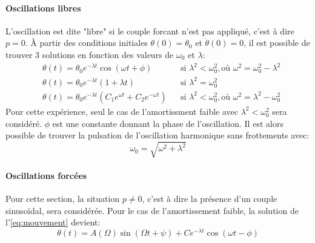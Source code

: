 \paragraph*{Oscillations libres}
L'oscillation est dite "libre" si le couple forcant n'est pas appliqué, c'est à dire \(p = 0\). À partir des conditions initiales \(\theta(0) = \theta_0\) et \(\dot\theta(0) = 0\), il est possible de trouver 3 solutions en fonction des valeurs de \(\omega_0\) et \(\lambda\):
\begin{align}
    &\theta(t) = \theta_0 e^{-\lambda t} \cos (\omega t + \phi) &&\textrm{si } \lambda^2 < \omega_0^2, \textrm{où } \omega^2 = \omega_0^2 - \lambda^2 \\
    \label{eq:oscil_libre}
    &\theta(t) = \theta_0 e^{-\lambda t} (1 + \lambda t) &&\textrm{si } \lambda^2 = \omega_0^2 \\
    &\theta(t) = \theta_0 e^{-\lambda t} \left(C_1e^{\omega t} + C_2e^{-\omega t}\right) &&\textrm{si } \lambda^2 < \omega_0^2, \textrm{où } \omega^2 = \lambda^2 - \omega_0^2
\end{align}
Pour cette expérience, seul le cas de l'amortissment faible avec \(\lambda^2 < \omega_0^2\) sera considéré. \(\phi\) est une constante donnant la phase de l'oscillation. Il est alors possible de trouver la pulsation de l'oscillation harmonique sans frottements avec:
\begin{equation}
    \omega_0 = \sqrt{\omega^2 + \lambda^2}
    \label{eq:omega_0}
\end{equation}

\paragraph*{Oscillations forcées}
Pour cette section, la situation \(p \ne 0\), c'est à dire la présence d'un couple sinusoïdal, sera considérée. Pour le cas de l'amortissement faible, la solution de l'\autoref{eq:mouvement} devient:
\begin{equation}
    \theta(t) = A(\Omega) \sin(\Omega t + \psi) + C e^{-\lambda t} \cos(\omega t - \phi)
    \label{eq:oscillations_forcees}
\end{equation}

